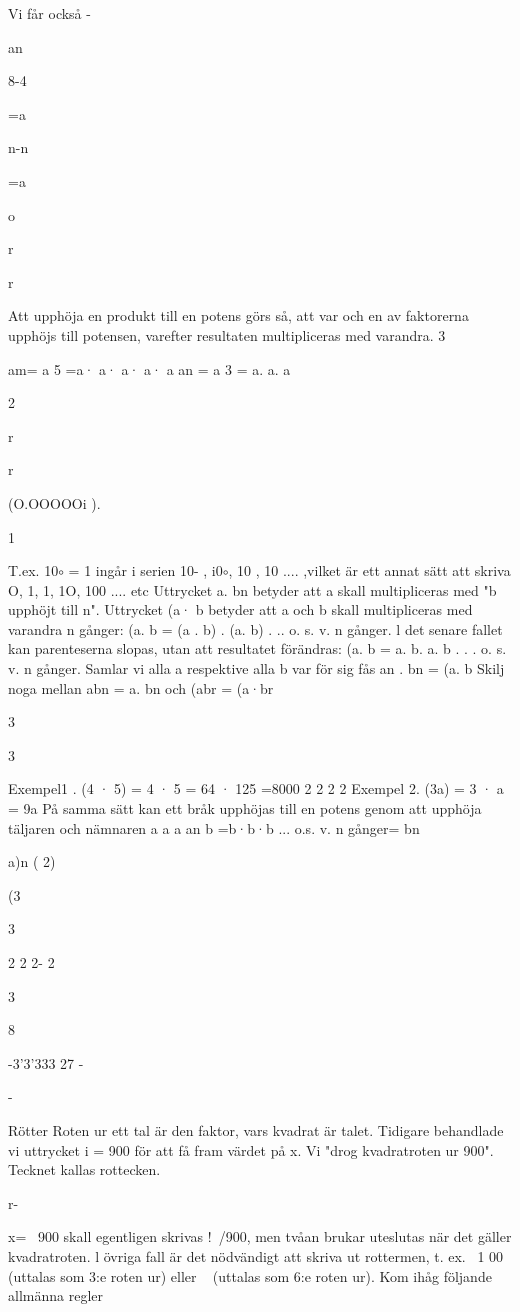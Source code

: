 Vi får också -

an

8-4

=a

n-n

=a

o

r

r

Att upphöja en produkt till en potens görs
så, att var och en av faktorerna upphöjs
till potensen, varefter resultaten multipliceras med varandra.
3

am= a 5 =a· a· a· a· a
an = a 3 = a. a. a

2

r

r

(O.OOOOOi ).

1

T.ex. 10$\circ$ = 1 ingår i serien 10- , i0$\circ$, 10 , 10
.... ,vilket är ett annat sätt att skriva O, 1, 1, 1O,
100 .... etc
Uttrycket a. bn betyder att a skall multipliceras med "b upphöjt till n".
Uttrycket (a· b betyder att a och b skall
multipliceras med varandra n gånger:
(a. b = (a . b) . (a. b) . .. o. s. v. n gånger.
l det senare fallet kan parenteserna slopas,
utan att resultatet förändras:
(a. b = a. b. a. b . . . o. s. v. n gånger.
Samlar vi alla a respektive alla b var för sig
fås an . bn = (a. b
Skilj noga mellan abn = a. bn
och
(abr = (a·br

3

3

Exempel1 . (4 · 5) = 4 · 5 = 64 · 125 =8000
2
2
2
2
Exempel 2. (3a) = 3 · a = 9a
På samma sätt kan ett bråk upphöjas till en
potens genom att upphöja täljaren och
nämnaren
a a a
an
b =b·b·b ... o.s. v. n gånger= bn

a)n
(
2)

(3

3

2 2 2- 2

3

8

-3'3'333 27
-

-

Rötter
Roten ur ett tal är den faktor, vars kvadrat är
talet.
Tidigare behandlade vi uttrycket i = 900 för
att få fram värdet på x. Vi "drog kvadratroten
ur 900".
Tecknet
kallas rottecken.

r-

x= ~900 skall egentligen skrivas !\ /900,
men tvåan brukar uteslutas när det gäller
kvadratroten. l övriga fall är det nödvändigt
att skriva ut rottermen, t. ex. ~1 00 (uttalas
som 3:e roten ur) eller ~ (uttalas som
6:e roten ur).
Kom ihåg följande allmänna regler

